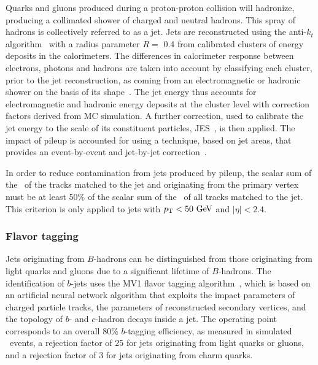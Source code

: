 Quarks and gluons produced during a proton-proton collision will hadronize,
producing a collimated shower of charged and neutral hadrons.
This spray of hadrons is collectively referred to as a jet.
Jets are reconstructed using the anti-$k_{t}$
algorithm~\cite{Cacciari:2008gp, Cacciari:2005hq} with a radius
parameter $R = $ 0.4 from calibrated clusters of energy deposits in
the calorimeters.
The differences in calorimeter response between electrons, photons and hadrons
are taken into account by classifying each cluster, prior to the jet
reconstruction, as coming from an electromagnetic or hadronic shower on the
basis of its shape~\cite{JES}.
The jet energy thus accounts for electromagnetic and hadronic energy deposits
at the cluster level with correction factors derived from MC simulation.
A further correction, used to calibrate the jet energy to the scale of its
constituent particles, JES~\cite{JES,JES2}, is then applied.
The impact of pileup is accounted for using a technique, based on jet areas,
that provides an event-by-event and jet-by-jet
correction~\cite{Cacciari:2007fd}.

In order to reduce contamination from jets produced by pileup,
the scalar sum of the \pt\ of the tracks matched to the jet and
originating from the primary vertex must be at least 50\% of the
scalar sum of the \pt\ of all tracks matched to the jet.
This criterion is only applied to jets with $\pt < 50 \GeV$ and
$|\eta| < 2.4$.

\FloatBarrier
\subsubsection{Flavor tagging} 
\label{sec:flavor_tagging}

Jets originating from $B$-hadrons can be distinguished from those originating
from light quarks and gluons due to a significant lifetime of $B$-hadrons.
The identification of $b$-jets uses the MV1 flavor tagging
algorithm~\cite{ATLAS-CONF-2014-004, ATLAS-CONF-2014-046}, which is
based on an artificial neural network algorithm that exploits the impact
parameters of charged particle tracks, the parameters of reconstructed
secondary vertices, and the topology of $b$- and $c$-hadron decays inside a
jet.
The operating point corresponds to an overall 80\% $b$-tagging efficiency, as
measured in simulated \TTBAR\ events, a rejection factor of 25 for jets
originating from light quarks or gluons, and a rejection factor of
3 for jets originating from charm quarks.

